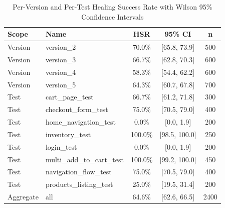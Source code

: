 \begin{table}[h]
\centering
\caption{Per-Version and Per-Test Healing Success Rate with Wilson 95\% Confidence Intervals}
\label{tab:statistical_analysis}
\begin{tabular}{llccc}
\toprule
Scope & Name & HSR & 95\% CI & n \\
\midrule
Version & version\_2 & 70.0\% & [65.8, 73.9] & 500 \\
Version & version\_3 & 66.7\% & [62.8, 70.3] & 600 \\
Version & version\_4 & 58.3\% & [54.4, 62.2] & 600 \\
Version & version\_5 & 64.3\% & [60.7, 67.8] & 700 \\
\midrule
Test & cart\_page\_test & 66.7\% & [61.2, 71.8] & 300 \\
Test & checkout\_form\_test & 75.0\% & [70.5, 79.0] & 400 \\
Test & home\_navigation\_test & 0.0\% & [0.0, 1.9] & 200 \\
Test & inventory\_test & 100.0\% & [98.5, 100.0] & 250 \\
Test & login\_test & 0.0\% & [0.0, 1.9] & 200 \\
Test & multi\_add\_to\_cart\_test & 100.0\% & [99.2, 100.0] & 450 \\
Test & navigation\_flow\_test & 75.0\% & [70.5, 79.0] & 400 \\
Test & products\_listing\_test & 25.0\% & [19.5, 31.4] & 200 \\
\midrule
Aggregate & all & 64.6\% & [62.6, 66.5] & 2400 \\
\bottomrule
\end{tabular}
\end{table}
